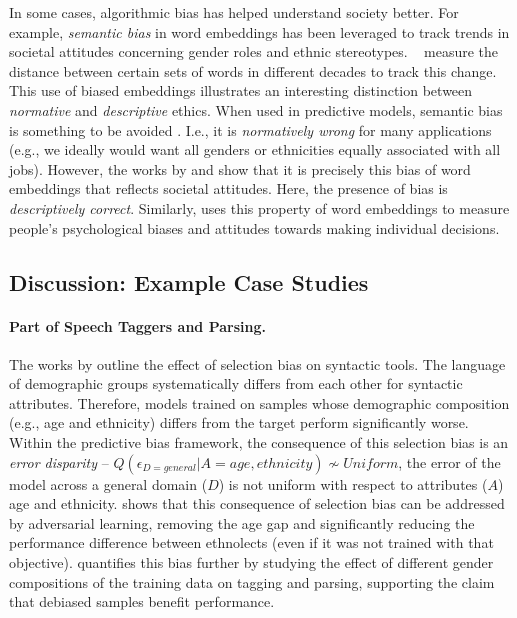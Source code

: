 In some cases, algorithmic bias has helped understand society better. 
For example, \textit{semantic bias} in word embeddings has been leveraged to track trends in societal attitudes concerning gender roles and ethnic stereotypes. ~ measure the distance between certain sets of words in different decades to track this change.
This use of biased embeddings illustrates an interesting distinction between \textit{normative} and \textit{descriptive} ethics. 
When used in predictive models, semantic bias is something to be avoided \cite{bolukbasi2016man}. I.e., it is \textit{normatively wrong} for many applications (e.g., we ideally would want all genders or ethnicities equally associated with all jobs). 
However, the works by  and  show that it is precisely this bias of word embeddings that reflects societal attitudes. Here, the presence of bias is \textit{descriptively correct}. Similarly,  uses this property of word embeddings to measure people's psychological biases and attitudes towards making individual decisions. 


\subsection{Discussion: Example Case Studies}
\label{sec:caseStudies}

\paragraph*{Part of Speech Taggers and Parsing.}
\label{appendix:case1}
The works by  outline the effect of selection bias on syntactic tools. The language of demographic groups systematically differs from each other for syntactic attributes. Therefore, models trained on samples whose demographic composition (e.g., age and ethnicity) differs from the target perform significantly worse.
Within the predictive bias framework, the consequence of this selection bias is an \textit{error disparity} -- $Q(\epsilon_{D = general}|A = {age, ethnicity}) \nsim Uniform$, the error of the model across a general domain ($D$) is not uniform with respect to attributes ($A$) age and ethnicity. 
 shows that this consequence of selection bias can be addressed by adversarial learning, removing the age gap and significantly reducing the performance difference between ethnolects (even if it was not trained with that objective).
 quantifies this bias further by studying the effect of different gender compositions of the training data on tagging and parsing, supporting the claim that debiased samples benefit performance. 


